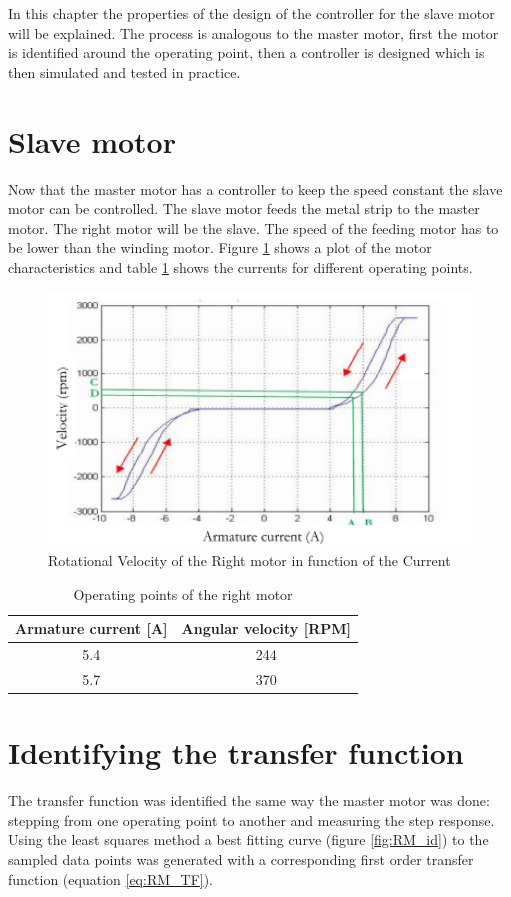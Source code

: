 In this chapter the properties of the design of the controller for the slave motor will be explained. The process is analogous to the master motor, first the motor is identified around the operating point, then a controller is designed which is then simulated and tested in practice.

\section{Slave motor}

Now that the master motor has a controller to keep the speed constant the slave motor can be controlled. The slave motor feeds the metal strip to the master motor. The right motor will be the slave. The speed of the feeding motor has to be lower than the winding motor. Figure \ref{fig:RM_RPM_curr} shows a plot of the motor characteristics and table \ref{tab:RM_operating_region} shows the currents for different operating points.

\begin{figure}[htbp]
\centering
\includegraphics[width = .7\textwidth]{pics/RM_RPM_Current.png}
\caption{Rotational Velocity of the Right motor in function of the Current}
\label{fig:RM_RPM_curr}
\end{figure}

\begin{table}[H]
	\centering
		\begin{tabular}{c|c}
        \toprule
			Armature current [A] & Angular velocity [RPM] \\ \midrule
            5.4 & 244 \\
            5.7 & 370 \\
		\end{tabular}
	\caption{Operating points of the right motor}
	\label{tab:RM_operating_region}
\end{table}

\FloatBarrier

\section{Identifying the transfer function}
The transfer function was identified the same way the master motor was done: stepping from one operating point to another and measuring the step response. Using the least squares method a best fitting curve (figure \ref{fig:RM_id}) to the sampled data points was generated with a corresponding first order transfer function (equation \ref{eq:RM_TF}). 

